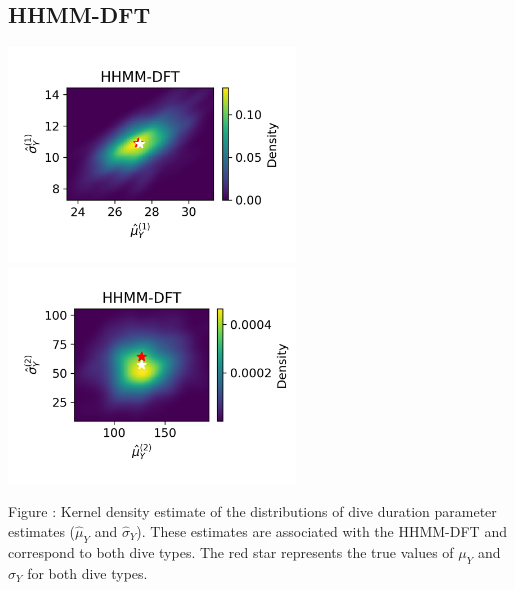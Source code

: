 \documentclass{article}
\begin{document}
        \subsection{HHMM-DFT}
        \begin{center}
        \includegraphics[width=3in]{../Plots/hhmm_FV_uncorr_MLE_density_dive_duration_-1_0.png}
        \includegraphics[width=3in]{../Plots/hhmm_FV_uncorr_MLE_density_dive_duration_-1_1.png}
        \end{center}

        \noindent Figure : Kernel density estimate of the distributions of dive duration parameter estimates ($\hat \mu_Y$ and $\hat \sigma_Y$). These estimates are associated with the HHMM-DFT and correspond to both dive types. The red star represents the true values of $\mu_Y$ and $\sigma_Y$ for both dive types.
        \addtocounter{fignum}{1}
        
\end{document}
